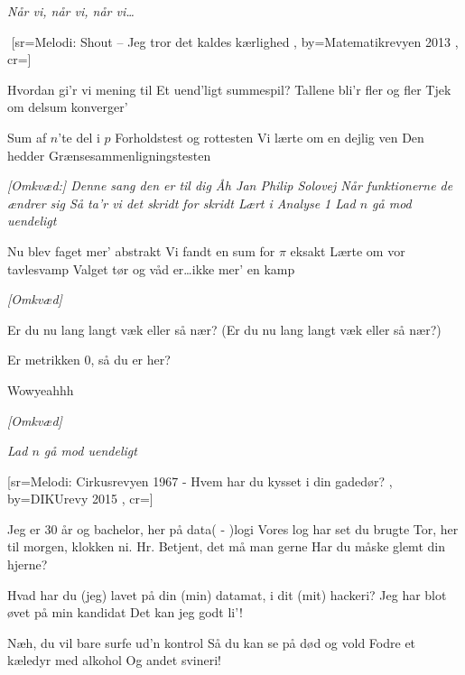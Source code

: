 \documentclass[pdftex,12pt]{article}
\begin{document}
\begin{songs}{}
\beginverse
\emph{Når vi, når vi, når vi\ldots}
\endverse


\endsong



﻿%
[sr={Melodi: Shout -- Jeg tror det kaldes kærlighed}
,
by={Matematikrevyen 2013}
,
cr={}]\hypertarget{Ode til Analyse 1}{}
\label{song28}

\beginverse
Hvordan gi’r vi mening til
Et uend’ligt summespil?
Tallene bli’r fler og fler
Tjek om delsum konverger’

\endverse
\beginverse
Sum af $n$’te del i $p$
Forholdstest og rottesten
Vi lærte om en dejlig ven
Den hedder Grænsesammenligningstesten

\endverse
\beginverse
\emph{[Omkvæd:]
Denne sang den er til dig
Åh Jan Philip Solovej
Når funktionerne de ændrer sig
Så ta’r vi det skridt for skridt
Lært i Analyse 1
Lad $n$ gå mod uendeligt}

\endverse
\beginverse
Nu blev faget mer’ abstrakt
Vi fandt en sum for $\pi$ eksakt
Lærte om vor tavlesvamp
Valget tør og våd er\ldots ikke mer’ en kamp

\endverse
\beginverse
\emph{[Omkvæd]}

\endverse
\beginverse
Er du nu lang langt væk eller så nær?
(Er du nu lang langt væk eller så nær?)

\endverse
\beginverse
Er metrikken 0, så du er her?

\endverse
\beginverse
Wowyeahhh

\endverse
\beginverse
\emph{[Omkvæd]}

\endverse
\beginverse
\emph{Lad $n$ gå mod uendeligt}

\endverse
\endsong



[sr={Melodi: Cirkusrevyen 1967 - Hvem har du kysset i din gadedør?}
,
by={DIKUrevy 2015}
,
cr={}]\hypertarget{Hvad har du lavet på din datamat?}{}
\label{song29}

\beginverse
Jeg er 30 år og bachelor,
her på data( - )logi
Vores log har set du brugte Tor,
her til morgen, klokken ni.
Hr. Betjent, det må man gerne
Har du måske glemt din hjerne?

Hvad har du (jeg) lavet på din (min) datamat,
i dit (mit) hackeri?
Jeg har blot øvet på min kandidat
Det kan jeg godt li'!

Næh, du vil bare surfe ud'n kontrol
Så du kan se på død og vold
Fodre et kæledyr med alkohol
Og andet svineri!


\end{songs}
\end{document}
